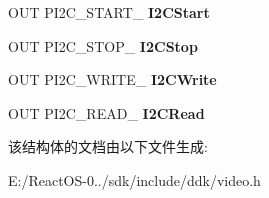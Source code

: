 \begin{DoxyCompactItemize}
O\+UT P\+I2\+C\+\_\+\+S\+T\+A\+R\+T\+\_ {\bfseries I2\+C\+Start}
\item 
\mbox{\label{struct___v_i_d_e_o___p_o_r_t___i2_c___i_n_t_e_r_f_a_c_e__2_a8865593cef13294bc03441dce0238e27}} 
O\+UT P\+I2\+C\+\_\+\+S\+T\+O\+P\+\_ {\bfseries I2\+C\+Stop}
\item 
\mbox{\label{struct___v_i_d_e_o___p_o_r_t___i2_c___i_n_t_e_r_f_a_c_e__2_a305bcbce9cf3fc8c93c593b0be06aeca}} 
O\+UT P\+I2\+C\+\_\+\+W\+R\+I\+T\+E\+\_ {\bfseries I2\+C\+Write}
\item 
\mbox{\label{struct___v_i_d_e_o___p_o_r_t___i2_c___i_n_t_e_r_f_a_c_e__2_a59aec6a389c2a0b0f0c8fc5a8fe2230a}} 
O\+UT P\+I2\+C\+\_\+\+R\+E\+A\+D\+\_ {\bfseries I2\+C\+Read}
\end{DoxyCompactItemize}


该结构体的文档由以下文件生成\+:\begin{DoxyCompactItemize}
\item 
E\+:/\+React\+O\+S-\/0../sdk/include/ddk/video.\+h\end{DoxyCompactItemize}
